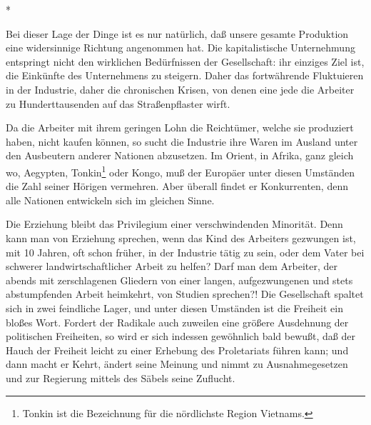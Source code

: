 \documentclass{scrbook}
\begin{document}
\begin{center}*\end{center}

Bei dieser Lage der Dinge ist es nur natürlich, daß unsere gesamte Produktion eine widersinnige Richtung angenommen hat. Die kapitalistische Unternehmung entspringt nicht den wirklichen Bedürfnissen der Gesellschaft: ihr einziges Ziel ist, die Einkünfte des Unternehmens zu steigern. Daher das fortwährende Fluktuieren in der Industrie, daher die chronischen Krisen, von denen eine jede die Arbeiter zu Hunderttausenden auf das Straßenpflaster wirft.

Da die Arbeiter mit ihrem geringen Lohn die Reichtümer, welche sie produziert haben, nicht kaufen können, so sucht die Industrie ihre Waren im Ausland unter den Ausbeutern anderer Nationen abzusetzen. Im Orient, in Afrika, ganz gleich wo, Aegypten, Tonkin\footnote{Tonkin ist die Bezeichnung für die nördlichste Region Vietnams.} oder Kongo, muß der Europäer unter diesen Umständen die Zahl seiner Hörigen vermehren. Aber überall findet er Konkurrenten, denn alle Nationen entwickeln sich im gleichen Sinne. 

Die Erziehung bleibt das Privilegium einer verschwindenden Minorität. Denn kann man von Erziehung sprechen, wenn das Kind des Arbeiters gezwungen ist, mit 10 Jahren, oft schon früher, in der Industrie tätig zu sein, oder dem Vater bei schwerer landwirtschaftlicher Arbeit zu helfen? Darf man dem Arbeiter, der abends mit zerschlagenen Gliedern von einer langen, aufgezwungenen und stets abstumpfenden Arbeit heimkehrt, von Studien sprechen?! Die Gesellschaft spaltet sich in zwei feindliche Lager, und unter diesen Umständen ist die Freiheit ein bloßes Wort. Fordert der Radikale auch zuweilen eine größere Ausdehnung der politischen Freiheiten, so wird er sich indessen gewöhnlich bald bewußt, daß der Hauch der Freiheit leicht zu einer Erhebung des Proletariats führen kann; und dann macht er Kehrt, ändert seine Meinung und nimmt zu Ausnahmegesetzen und zur Regierung mittels des Säbels seine Zuflucht.
\end{document}
